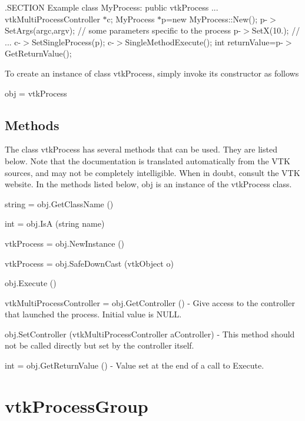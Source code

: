 .S\-E\-C\-T\-I\-O\-N Example class My\-Process\-: public vtk\-Process ... vtk\-Multi\-Process\-Controller $\ast$c; My\-Process $\ast$p=new My\-Process\-::\-New(); p-\/$>$Set\-Args(argc,argv); // some parameters specific to the process p-\/$>$Set\-X(10.); // ... c-\/$>$Set\-Single\-Process(p); c-\/$>$Single\-Method\-Execute(); int return\-Value=p-\/$>$Get\-Return\-Value();

To create an instance of class vtk\-Process, simply invoke its constructor as follows \begin{DoxyVerb}  obj = vtkProcess
\end{DoxyVerb}
 \hypertarget{vtkwidgets_vtkxyplotwidget_Methods}{}\subsection{Methods}\label{vtkwidgets_vtkxyplotwidget_Methods}
The class vtk\-Process has several methods that can be used. They are listed below. Note that the documentation is translated automatically from the V\-T\-K sources, and may not be completely intelligible. When in doubt, consult the V\-T\-K website. In the methods listed below, {\ttfamily obj} is an instance of the vtk\-Process class. 
\begin{DoxyItemize}
\item {\ttfamily string = obj.\-Get\-Class\-Name ()}  
\item {\ttfamily int = obj.\-Is\-A (string name)}  
\item {\ttfamily vtk\-Process = obj.\-New\-Instance ()}  
\item {\ttfamily vtk\-Process = obj.\-Safe\-Down\-Cast (vtk\-Object o)}  
\item {\ttfamily obj.\-Execute ()}  
\item {\ttfamily vtk\-Multi\-Process\-Controller = obj.\-Get\-Controller ()} -\/ Give access to the controller that launched the process. Initial value is N\-U\-L\-L.  
\item {\ttfamily obj.\-Set\-Controller (vtk\-Multi\-Process\-Controller a\-Controller)} -\/ This method should not be called directly but set by the controller itself.  
\item {\ttfamily int = obj.\-Get\-Return\-Value ()} -\/ Value set at the end of a call to Execute.  
\end{DoxyItemize}\hypertarget{vtkparallel_vtkprocessgroup}{}\section{vtk\-Process\-Group}\label{vtkparallel_vtkprocessgroup}
